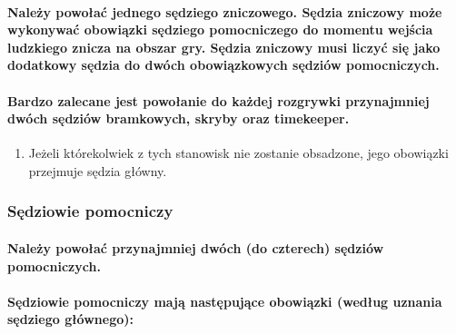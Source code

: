 \documentclass[12pt]{article}
\begin{document}
\paragraph{Należy powołać jednego sędziego zniczowego. Sędzia
zniczowy może wykonywać obowiązki sędziego pomocniczego do momentu
wejścia ludzkiego znicza na obszar gry. Sędzia zniczowy musi liczyć się
jako dodatkowy sędzia do dwóch obowiązkowych sędziów pomocniczych.}

\paragraph{Bardzo zalecane jest powołanie do każdej rozgrywki
przynajmniej dwóch sędziów bramkowych, skryby oraz timekeeper.}

\begin{enumerate}
\item
    Jeżeli którekolwiek z tych stanowisk nie zostanie obsadzone, jego
  obowiązki przejmuje sędzia główny.
  \end{enumerate}

\subsubsection{Sędziowie pomocniczy}

\paragraph{Należy powołać przynajmniej dwóch (do czterech)
sędziów pomocniczych.}

\paragraph{Sędziowie pomocniczy mają następujące obowiązki
(według uznania sędziego głównego):}
\end{document}
